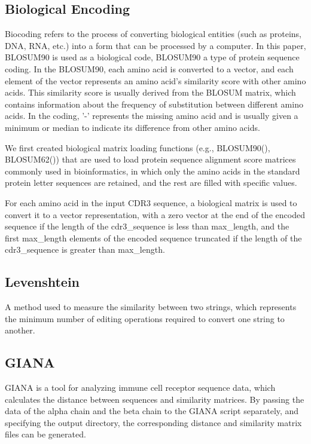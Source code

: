 \documentclass[conference]{IEEEtran}
\begin{document}
	\subsection{Biological Encoding}\label{AA}
	
	Biocoding refers to the process of converting biological entities (such as proteins, DNA, RNA, etc.) into a form that can be processed by a computer. In this paper, BLOSUM90 is used as a biological code, BLOSUM90 a type of protein sequence coding. In the BLOSUM90, each amino acid is converted to a vector, and each element of the vector represents an amino acid's similarity score with other amino acids. This similarity score is usually derived from the BLOSUM matrix, which contains information about the frequency of substitution between different amino acids. In the coding, '-' represents the missing amino acid and is usually given a minimum or median to indicate its difference from other amino acids.
	
	We first created biological matrix loading functions (e.g., BLOSUM90(), BLOSUM62()) that are used to load protein sequence alignment score matrices commonly used in bioinformatics, in which only the amino acids in the standard protein letter sequences are retained, and the rest are filled with specific values.
	
	For each amino acid in the input CDR3 sequence, a biological matrix is used to convert it to a vector representation, with a zero vector at the end of the encoded sequence if the length of the cdr3\_sequence is less than max\_length, and the first max\_length elements of the encoded sequence truncated if the length of the cdr3\_sequence is greater than max\_length.
	
	\subsection{Levenshtein}\label{AA}
	A method used to measure the similarity between two strings, which represents the minimum number of editing operations required to convert one string to another.
	
	\subsection{GIANA}\label{AA}
	GIANA is a tool for analyzing immune cell receptor sequence data, which calculates the distance between sequences and similarity matrices. By passing the data of the alpha chain and the beta chain to the GIANA script separately, and specifying the output directory, the corresponding distance and similarity matrix files can be generated.
	
\end{document}

